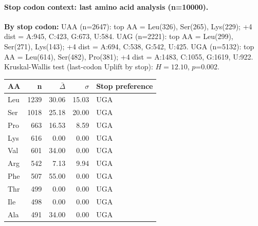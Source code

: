\paragraph{Stop codon context: last amino acid analysis (n=10000).}
\textbf{By stop codon:}
  UAA (n=2647): top AA = Leu(326), Ser(265), Lys(229); +4 dist = A:945, C:423, G:673, U:584.
  UAG (n=2221): top AA = Leu(299), Ser(271), Lys(143); +4 dist = A:694, C:538, G:542, U:425.
  UGA (n=5132): top AA = Leu(614), Ser(482), Pro(381); +4 dist = A:1483, C:1055, G:1619, U:922.
Kruskal-Wallis test (last-codon Uplift by stop): $H=12.10$, $p$=0.002.
\begin{center}\small
\begin{tabular}{lrrrl}\toprule
AA & n & $\bar\Delta$ & $\sigma$ & Stop preference \\\midrule
Leu & 1239 & 30.06 & 15.03 & UGA \\
Ser & 1018 & 25.18 & 20.00 & UGA \\
Pro & 663 & 16.53 & 8.59 & UGA \\
Lys & 616 & 0.00 & 0.00 & UGA \\
Val & 601 & 34.00 & 0.00 & UGA \\
Arg & 542 & 7.13 & 9.94 & UGA \\
Phe & 507 & 55.00 & 0.00 & UGA \\
Thr & 499 & 0.00 & 0.00 & UGA \\
Ile & 498 & 0.00 & 0.00 & UGA \\
Ala & 491 & 34.00 & 0.00 & UGA \\
\bottomrule\end{tabular}\end{center}

